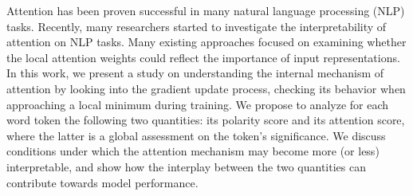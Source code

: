 Attention has been proven successful in many natural language processing (NLP) tasks. Recently, many researchers started to investigate the interpretability of attention on NLP tasks. Many existing approaches focused on examining whether the local attention weights could reflect the importance of input representations. In this work, we present a study on understanding the internal mechanism of attention by looking into the gradient update process, checking its behavior when approaching a local minimum during training. We propose to analyze for each word token the following two quantities: its polarity score and its attention score, where the latter is a global assessment on the token's significance. We discuss conditions under which the attention mechanism may become more (or less) interpretable, and show how the interplay between the two quantities can contribute towards model performance.
